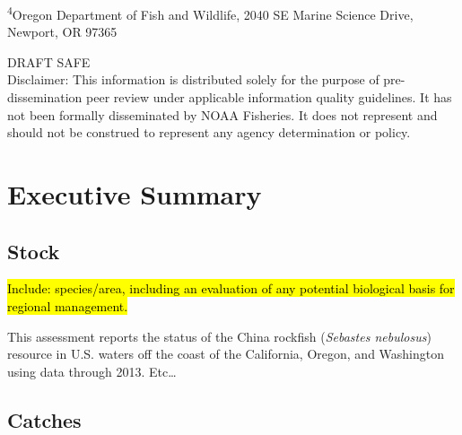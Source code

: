 \documentclass[12pt,]{article}
\begin{document}
\begin{center}
\vspace{.3cm}

\textsuperscript{4}Oregon Department of Fish and Wildlife, 2040 SE Marine Science Drive, Newport, OR 97365\\


\vspace{.5cm}

\vfill
DRAFT SAFE\\
Disclaimer: This information is distributed solely for the purpose of pre-dissemination
peer review under applicable information quality guidelines. It has not been formally
disseminated by NOAA Fisheries. It does not represent and should not be construed to
represent any agency determination or policy. 

\vspace{.3cm}

\maketitle

\setcounter{page}{1}
\end{center}

{
\setcounter{tocdepth}{4}
\tableofcontents
}
\setlength{\parskip}{5mm plus1mm minus1mm} \pagebreak

 \setcounter{page}{1}
\renewcommand{\thefigure}{\alph{figure}}
\renewcommand{\thetable}{\alph{table}}

\section*{Executive Summary}\label{executive-summary}

\subsection*{Stock}\label{stock}

\hl{Include: species/area, including an evaluation of any potential biological basis 
for regional management.}

This assessment reports the status of the China rockfish
(\emph{Sebastes nebulosus}) resource in U.S. waters off the coast of the
California, Oregon, and Washington using data through 2013. Etc\ldots{}

\subsection*{Catches}\label{catches}
\end{document}
